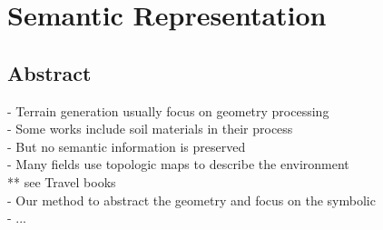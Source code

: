 \part{Semantic Representation}
\label{part:semantic-representation}

\chapter*{Abstract}
\label{chap:semantic-representation_abstract}
- Terrain generation usually focus on geometry processing \\
- Some works include soil materials in their process \\
- But no semantic information is preserved \\
- Many fields use topologic maps to describe the environment \\
** see Travel books \\
- Our method to abstract the geometry and focus on the symbolic \\
- ... 


